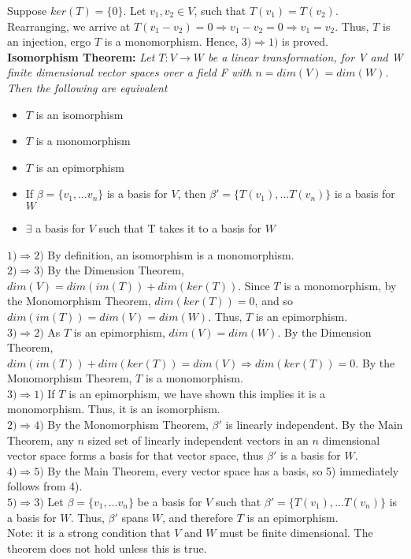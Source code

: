 \documentclass[12pt]{article}
\begin{document}
Suppose $ker(T) = \{ 0 \}$. Let $v_1, v_2 \in V$, such that $T(v_1) = T(v_2)$. Rearranging, we arrive at $T(v_1 - v_2) = 0 \Rightarrow v_1 - v_2 = 0 \Rightarrow v_1 = v_2$. Thus, $T$ is an injection, ergo $T$ is a monomorphism. Hence, $3) \Rightarrow 1)$ is proved.\\
 
 
\textbf{Isomorphism Theorem: }\emph{Let $T: V \rightarrow W$ be a linear transformation, for V and W finite dimensional vector spaces over a field F with $n = dim(V) = dim(W)$. Then the following are equivalent}
\begin{itemize}
\item $T$ is an isomorphism
\item $T$ is a monomorphism
\item $T$ is an epimorphism
\item If $\beta = \{ v_1, \dots v_n \}$ is a basis for $V$, then $\beta' = \{ T(v_1), \dots T(v_n) \}$ is a basis for $W$
\item $\exists$ a basis for $V$ such that T takes it to a basis for $W$
\end{itemize}
$1) \Rightarrow 2)$ By definition, an isomorphism is a monomorphism.\\

$2) \Rightarrow 3)$ By the Dimension Theorem, $dim(V) = dim(im(T)) + dim(ker(T))$. Since $T$ is a monomorphism, by the Monomorphism Theorem, $dim(ker(T)) = 0$, and so $dim(im(T)) = dim(V) = dim(W)$. Thus, $T$ is an epimorphism.\\

$3) \Rightarrow 2)$ As $T$ is an epimorphism, $dim(V) = dim(W)$. By the Dimension Theorem, $dim(im(T)) + dim(ker(T)) = dim(V) \Rightarrow dim(ker(T)) = 0$. By the Monomorphism Theorem, $T$ is a monomorphism.\\

$3) \Rightarrow 1)$ If $T$ is an epimorphism, we have shown this implies it is a monomorphism. Thus, it is an isomorphism.\\

$2) \Rightarrow 4)$ By the Monomorphism Theorem, $\beta'$ is linearly independent. By the Main Theorem, any $n$ sized set of linearly independent vectors in an $n$ dimensional vector space forms a basis for that vector space, thus $\beta'$ is a basis for $W$.\\

$4) \Rightarrow 5)$ By the Main Theorem, every vector space has a basis, so 5) immediately follows from 4).\\

$5) \Rightarrow 3)$ Let $\beta = \{ v_1, \dots v_n \}$ be a basis for $V$ such that $\beta' = \{ T(v_1), \dots T(v_n) \}$ is a basis for $W$. Thus, $\beta'$ spans $W$, and therefore $T$ is an epimorphism.\\

Note: it is a strong condition that $V$ and $W$ must be finite dimensional. The theorem does not hold unless this is true.
\end{document}
